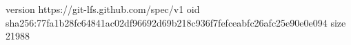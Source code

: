 version https://git-lfs.github.com/spec/v1
oid sha256:77fa1b28fc64841ac02df96692d69b218c936f7fefceabfc26afc25e90e0e094
size 21988
